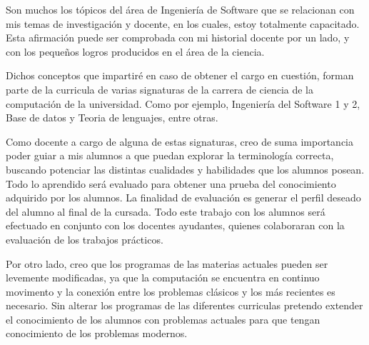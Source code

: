 Son muchos los t\'opicos del \'area de Ingenier\'ia de Software que se relacionan con mis
temas de investigaci\'on y docente, en los cuales, estoy totalmente capacitado.
Esta afirmaci\'on puede ser comprobada con mi historial docente por un lado, y con los peque\~nos logros producidos en el \'area de la ciencia.

Dichos conceptos que impartir\'e en caso de obtener el cargo en cuesti\'on, forman parte de
la curricula de varias signaturas de la carrera de ciencia de la computaci\'on de la universidad. Como por ejemplo, Ingenier\'ia del Software 1 y 2, Base de datos y Teoria de lenguajes, entre otras.

Como docente a cargo de alguna de estas signaturas, creo de suma importancia poder
guiar a mis alumnos a que puedan explorar la terminolog\'ia correcta, buscando potenciar 
las distintas cualidades y habilidades que los alumnos posean. Todo lo aprendido
ser\'a evaluado para obtener una prueba del conocimiento adquirido por los alumnos.
La finalidad de evaluaci\'on es generar el perfil deseado del alumno al final de la cursada. Todo este trabajo con los alumnos ser\'a efectuado en conjunto con los 
docentes ayudantes, quienes colaboraran con la evaluaci\'on de los trabajos pr\'acticos.

Por otro lado, creo que los programas de las materias actuales pueden ser levemente
modificadas, ya que la computaci\'on se encuentra en continuo movimento y la conexi\'on
entre los problemas cl\'asicos y los m\'as recientes es necesario.
Sin alterar los programas de las diferentes curriculas pretendo extender el
conocimiento de los alumnos con problemas actuales para que tengan conocimiento
de los problemas modernos.
  





